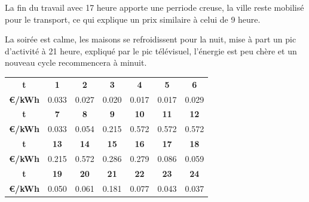 La fin du travail avec 17 heure apporte une perriode creuse, la ville reste mobilisé pour le transport, ce qui explique
un prix similaire à celui de 9 heure.

La soirée est calme, les maisons se refroidissent pour la nuit, mise à part un pic d'activité à 21 heure, expliqué par le
pic télévisuel, l'énergie est peu chère et un nouveau cycle recommencera à minuit.

\begin{tabular}{ | c | c | c | c | c | c | c | }
  \hline
  \textbf{t} & \textbf{1} & \textbf{2} & \textbf{3} & \textbf{4} & \textbf{5} & \textbf{6} \\
  \textbf{€/kWh} & 0.033 & 0.027 & 0.020 & 0.017 & 0.017 & 0.029 \\
  \hline
  \textbf{t} & \textbf{7} & \textbf{8} & \textbf{9} & \textbf{10} & \textbf{11} & \textbf{12} \\
  \textbf{€/kWh} & 0.033 & 0.054 & 0.215 & 0.572 & 0.572 & 0.572 \\
  \hline
  \textbf{t} & \textbf{13} & \textbf{14} & \textbf{15} & \textbf{16} & \textbf{17} & \textbf{18} \\
  \textbf{€/kWh} & 0.215 & 0.572 & 0.286 & 0.279 & 0.086 & 0.059 \\
  \hline
  \textbf{t} & \textbf{19} & \textbf{20} & \textbf{21} & \textbf{22} & \textbf{23} & \textbf{24} \\
  \textbf{€/kWh} & 0.050 & 0.061 & 0.181 & 0.077 & 0.043 & 0.037 \\
  \hline
\end{tabular}


